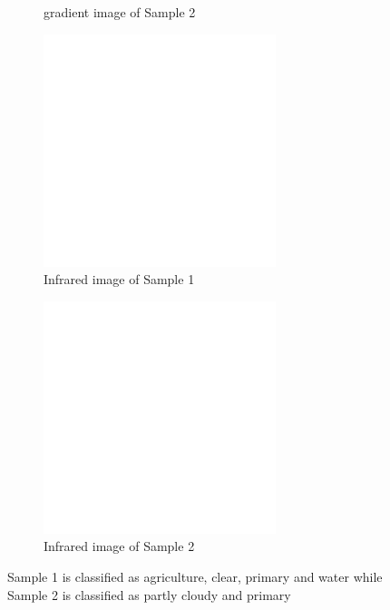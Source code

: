 \documentclass[10pt,twocolumn,letterpaper]{article}
\begin{document}
\begin{figure}
\begin{subfigure}{.5\columnwidth}
\caption{gradient image of Sample 2}
\end{subfigure}
\begin{subfigure}{.5\columnwidth}
\includegraphics[width=0.9\columnwidth]{sample_images/train_1_inf.png}
\caption{Infrared image of Sample 1}
\end{subfigure}%
\begin{subfigure}{.5\columnwidth}
\includegraphics[width=0.9\columnwidth]{sample_images/train_1000_inf.png}
\caption{Infrared image of Sample 2}
\end{subfigure}
\caption{Sample 1 is classified as agriculture, clear, primary and water while Sample 2 is classified as partly cloudy and primary}
\label{fig:exp_images}
\end{figure}
\end{document}
